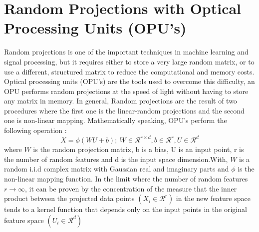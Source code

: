 \section{Random Projections with Optical Processing Units (OPU's)}
Random projections is one of the important techniques in machine learning and signal processing, but it requires either to store a very large random matrix, or to use a
different, structured matrix to reduce the computational and memory costs. Optical processing units (OPU's) are the tools used to overcome this difficulty, an OPU performs random projections at the speed of light without having to store any matrix in memory. In general, Random projections are the result of two procedures where the first one is the linear-random projections and the second one is non-linear mapping.
Mathematically speaking, OPU's perform the following operation \citep{saade_opu}:
\begin{equation}
\label{OPU_equation}
    X=\phi(WU+b);~W\in \mathcal{R}^{r\times d},b\in \mathcal{R}^r, U\in \mathcal{R}^d
\end{equation}
where $W$ is the random projection matrix, b is a bias, U is an input point, r is the number of random features and d is the input space dimension.With, $W$ is a random i.i.d complex matrix with Gaussian real and imaginary parts and $\phi$ is the non-linear mapping function.\newline
In the limit where the number of random features $r\xrightarrow{}\infty$, it can be proven by the concentration of the measure that the inner product between the projected data points $(X_i\in \mathcal{R}^r)$ in the new feature space tends to a kernel function that depends only on the input points in the original feature space $(U_i\in \mathcal{R}^d)$

